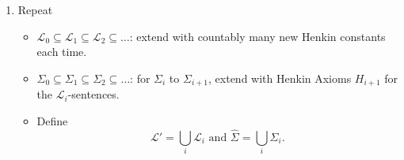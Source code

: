 \documentclass[11pt,letterpaper]{book}
\theoremstyle{definition}
\begin{document}
\begin{enumerate}
\begin{proof}
Focus on $\Sigma \cup A \vdash  \lnot \theta_c ^x $. Analogous to the
proof in Lemma \ref{lemma:consistent_extension_by_constants}, we can
take a deduction of $\lnot \theta_c ^x$ and replace each Henkin constant
$c$ by a new variable $z$, the result is still a deduction. Thus,
\begin{eqnarray*}
& & \Sigma \cup A \vdash  \lnot \theta_c ^x \\
& \Rightarrow & \Sigma \cup A \vdash \lnot \theta_z ^x \\
& \Rightarrow & \Sigma \cup A \vdash (\forall z )( \lnot \theta_z ^x)
\quad \text{by Lemma \ref{lemma:deduce_to_forall}: } \Sigma \vdash
\theta \iff \Sigma \vdash \forall x \theta \\
&   & \text{Axiom \ref{def:quantify_axiom_1}: }
(\forall x)( \phi) \rightarrow \phi_t ^{x} \text{ if $t$ is
substitutable for $x$ in $\phi$} \\
& & \text{ leads to } (\forall z )( \lnot \theta_z ^x) \rightarrow \lnot
(\theta_z ^x)_x ^z ,\\
& & \text{ since $x$ is substitutable for $z$ (remember $z$ is a
new variable)} \\
& \Rightarrow & \Sigma \cup A \vdash \lnot (\theta_z ^x)_x ^z \\
& \Rightarrow & \Sigma \cup A \vdash \lnot \theta \\
& \Rightarrow & \Sigma \cup A \vdash \forall x \lnot \theta \quad
\text{by Lemma \ref{lemma:deduce_to_forall}: } \Sigma \vdash \theta \iff
\Sigma \vdash \forall x \theta  \\
& \Rightarrow & \Sigma \cup A \vdash \perp \quad \text{ together by
}\Sigma \cup A \vdash \lnot \forall x \lnot \theta  \\
& \Rightarrow & \Sigma \cup \{ \phi_1, \ldots, \phi_m \} \text{ is
inconsistent}
\end{eqnarray*}

But $m$ is the smallest integer, contradiction observes. Thus,
$\Sigma_1$ is consistent.
\end{proof}

\item{Repeat}
\begin{itemize}
\item{$ \mathcal{L}_0 \subseteq \mathcal{L}_1 \subseteq \mathcal{L}_2
\subseteq \ldots$: extend with countably many new Henkin constants each
time.}
\item{$ \Sigma_0 \subseteq \Sigma_1 \subseteq \Sigma_2 \subseteq \ldots
$: for $\Sigma_i$ to $\Sigma_{i+1}$, extend with Henkin Axioms $H_{i+1}$
for the $\mathcal{L}_i$-sentences. }
\item{Define
$$ \mathcal{L}' = \bigcup_{i} \mathcal{L}_i \text{ and } \hat{\Sigma} =
\bigcup_{i} \Sigma_i .$$

}
\end{itemize}
\end{enumerate}
\end{document}
